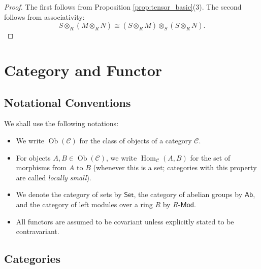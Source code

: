 \begin{proof}
The first follows from Proposition \ref{prop:tensor_basic}(3). The second follows from associativity:
\[
S \otimes_R (M \otimes_R N) \cong (S \otimes_R M) \otimes_S (S \otimes_R N).
\]
\end{proof}
\section{Category and Functor}


\subsection*{Notational Conventions}

We shall use the following notations:
\begin{itemize}
    \item We write $\operatorname{Ob}(\mathcal{C})$ for the class of objects of a category $\mathcal{C}$.
    \item For objects $A, B \in \operatorname{Ob}(\mathcal{C})$, we write $\operatorname{Hom}_{\mathcal{C}}(A, B)$ for the set of morphisms from $A$ to $B$ (whenever this is a set; categories with this property are called \emph{locally small}).
    \item We denote the category of sets by $\mathsf{Set}$, the category of abelian groups by $\mathsf{Ab}$, and the category of left modules over a ring $R$ by $R\text{-}\mathsf{Mod}$.
    \item All functors are assumed to be covariant unless explicitly stated to be contravariant.
\end{itemize}

\subsection{Categories}

